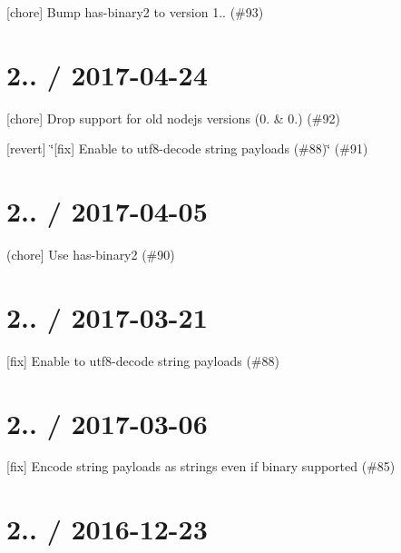 
\begin{DoxyItemize}
\item \mbox{[}chore\mbox{]} Bump has-\/binary2 to version 1.. (\#93)
\end{DoxyItemize}

\section*{2.. / 2017-\/04-\/24 }


\begin{DoxyItemize}
\item \mbox{[}chore\mbox{]} Drop support for old nodejs versions (0. \& 0.) (\#92)
\item \mbox{[}revert\mbox{]} \char`\"{}\mbox{[}fix\mbox{]} Enable to utf8-\/decode string payloads (\#88)\char`\"{} (\#91)
\end{DoxyItemize}

\section*{2.. / 2017-\/04-\/05 }


\begin{DoxyItemize}
\item (chore\mbox{]} Use has-\/binary2 (\#90)
\end{DoxyItemize}

\section*{2.. / 2017-\/03-\/21 }


\begin{DoxyItemize}
\item \mbox{[}fix\mbox{]} Enable to utf8-\/decode string payloads (\#88)
\end{DoxyItemize}

\section*{2.. / 2017-\/03-\/06 }


\begin{DoxyItemize}
\item \mbox{[}fix\mbox{]} Encode string payloads as strings even if binary supported (\#85)
\end{DoxyItemize}

\section*{2.. / 2016-\/12-\/23 }


